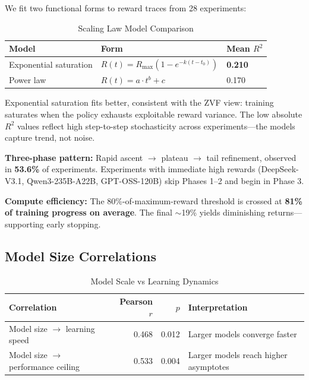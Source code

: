 \documentclass[12pt,a4paper]{report}
\theoremstyle{definition}
\begin{document}
We fit two functional forms to reward traces from 28 experiments:

\begin{table}[htbp]
\centering
\caption{Scaling Law Model Comparison}
\label{tab:scaling-models}
\begin{tabular}{lll}
\toprule
\textbf{Model} & \textbf{Form} & \textbf{Mean $R^2$} \\
\midrule
Exponential saturation & $R(t) = R_{\max}(1 - e^{-k(t - t_0)})$ & \textbf{0.210} \\
Power law              & $R(t) = a \cdot t^b + c$ & 0.170 \\
\bottomrule
\end{tabular}
\end{table}

Exponential saturation fits better, consistent with the ZVF view: training saturates when the policy
exhausts exploitable reward variance. The low absolute $R^2$ values reflect high step-to-step
stochasticity across experiments---the models capture trend, not noise.

\textbf{Three-phase pattern:} Rapid ascent $\rightarrow$ plateau $\rightarrow$ tail refinement, observed in
\textbf{53.6\%} of experiments. Experiments with immediate high rewards (DeepSeek-V3.1,
Qwen3-235B-A22B, GPT-OSS-120B) skip Phases 1--2 and begin in Phase 3.

\textbf{Compute efficiency:} The 80\%-of-maximum-reward threshold is crossed at \textbf{81\% of training
progress on average}. The final $\sim$19\% yields diminishing returns---supporting early stopping.

\subsection{Model Size Correlations}

\begin{table}[htbp]
\centering
\caption{Model Scale vs Learning Dynamics}
\label{tab:size-correlations}
\begin{tabular}{lrrl}
\toprule
\textbf{Correlation} & \textbf{Pearson $r$} & \textbf{$p$} & \textbf{Interpretation} \\
\midrule
Model size $\to$ learning speed  & 0.468 & 0.012 & Larger models converge faster \\
Model size $\to$ performance ceiling & 0.533 & 0.004 & Larger models reach higher asymptotes \\
\bottomrule
\end{tabular}
\end{table}
\end{document}
